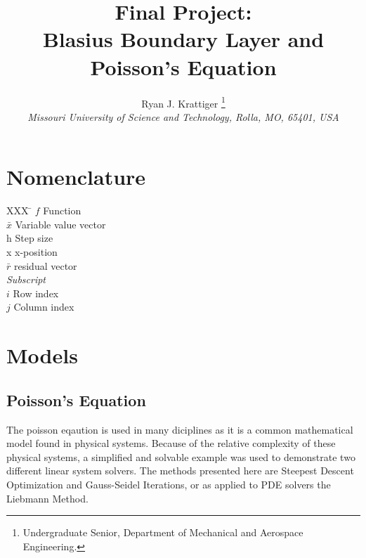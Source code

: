 \documentclass[]{aiaa-tc}%
\title{Final Project: \\ Blasius Boundary Layer and Poisson's Equation}
\author{
  Ryan J. Krattiger%
    \thanks{Undergraduate Senior, Department of Mechanical and Aerospace Engineering.} \\
  {\normalsize\itshape
  Missouri University of Science and Technology, Rolla, MO, 65401, USA}
 }
\begin{document}
\maketitle

\begin{abstract}

\end{abstract}

\newpage

\tableofcontents

\lstlistoflistings

\newpage

\section*{Nomenclature}

\begin{tabbing}
  XXX \= \kill%
  $f$ \> Function \\
  $\bar x$ \> Variable value vector \\
  h \> Step size \\
  x \> x-position \\
  $\bar r$ \> residual vector \\
  \textit{Subscript} \\
  $i$ \> Row index \\
  $j$ \> Column index \\
 \end{tabbing}

\FloatBarrier\section{Models}

\FloatBarrier\subsection{Poisson's Equation}

The poisson eqaution is used in many diciplines as it is a common mathematical
model found in physical systems. Because of the relative complexity of these
physical systems, a simplified and solvable example was used to demonstrate 
two different linear system solvers. The methods presented here are 
Steepest Descent Optimization and Gauss-Seidel Iterations, or as applied to PDE
solvers the Liebmann Method.
\end{document}
